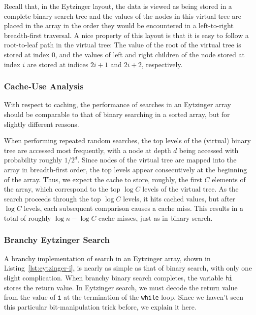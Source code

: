 \documentclass{patmorin}
\newcommand{\lstref}[1]{Listing~\ref{lst:#1}}
\begin{document}
Recall that, in the Eytzinger layout, the data is viewed as being
stored in a complete binary search tree and the values of the nodes in
this virtual tree are placed in the array in the order they would be
encountered in a left-to-right breadth-first traversal.  A nice property
of this layout is that it is easy to follow a root-to-leaf path in the
virtual tree: The value of the root of the virtual tree is stored at
index 0, and the values of left and right children of the node stored
at index $i$ are stored at indices $2i+1$ and $2i+2$, respectively.


\subsubsection{Cache-Use Analysis}

With respect to caching, the performance of searches in an Eytzinger
array should be comparable to that of binary searching in a sorted array,
but for slightly different reasons.

When performing repeated random searches, the top levels of the (virtual)
binary tree are accessed most frequently, with a node at depth $d$
being accessed with probability roughly $1/2^d$.  Since nodes of the
virtual tree are mapped into the array in breadth-first order, the
top levels appear consecutively at the beginning of the array. Thus,
we expect the cache to store, roughly, the first $C$ elements of the
array, which correspond to the top $\log C$ levels of the virtual tree.
As the search proceeds through the top $\log C$ levels, it hits cached
values, but after $\log C$ levels, each subsequent comparison causes
a cache miss.  This results in a total of roughly $\log n-\log C$ cache
misses, just as in binary search.

\subsubsection{Branchy Eytzinger Search}

A branchy implementation of search in an Eytzinger array, shown in
\lstref{eytzinger-i}, is nearly as simple as that of binary search, with
only one slight complication. When branchy binary search completes, the
variable \texttt{hi} stores the return value. In Eytzinger search,
we must decode the return value from the value of \texttt{i}
at the termination of the \texttt{while} loop.  Since we haven't seen
this particular bit-manipulation trick before, we explain it here.
\end{document}
